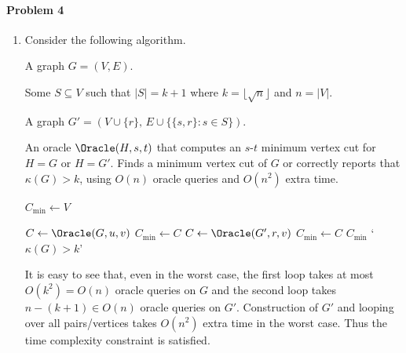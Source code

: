 \documentclass[12pt]{article}
\begin{document}
\paragraph{Problem 4}
\begin{enumerate}[label=\alph*., font=\bfseries]
\item Consider the following algorithm.
\begin{algorithm}[h]
\caption{Finding a minimum vertex cut with a promise}
\begin{algorithmic}
\Require A graph $G=(V,E)$.

Some $S\subseteq V$ such that $|S|=k+1$ where $k=\lfloor \sqrt{n}\rfloor$ and $n = |V|$.

A graph $G'=(V\cup\{r\},\, E \cup \{\{s,r\}: s\in S\})$.

An oracle $\Oracle(H,s,t)$ that computes an $s$-$t$ minimum vertex cut for $H=G$ or $H=G'$.
\Ensure Finds a minimum vertex cut of $G$ or correctly reports that $\kappa(G) > k$, using $O(n)$ oracle queries and $O\left(n^2\right)$ extra time.

\State $C_{\min} \gets V$ 

    \State $C \gets \Oracle(G,u,v)$ 
        \State $C_{\min} \gets C$ 
    \EndIf
\EndFor
{} 
    \State $C \gets \Oracle(G',r,v)$ 
        \State $C_{\min} \gets C$ 
    \EndIf
\EndFor
{} 
    \State \Return $C_{\min}$
\Else {}
    \State \Return `$\kappa(G) > k$'
\EndIf
\end{algorithmic}
\end{algorithm}

It is easy to see that, even in the worst case, the first loop takes at most $O\left(k^2\right)=O(n)$ oracle queries on $G$ and the second loop takes $n-(k+1)\in O(n)$ oracle queries on $G'$. Construction of $G'$ and looping over all pairs/vertices takes $O\left(n^2\right)$ extra time in the worst case. Thus the time complexity constraint is satisfied.


\end{enumerate}
\end{document}
